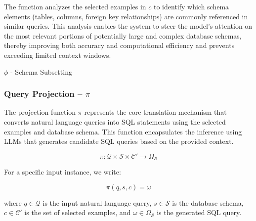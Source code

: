 The function analyzes the selected examples in $c$ to identify which schema elements
(tables, columns, foreign key relationships) are commonly referenced in similar queries.
This analysis enables the system to steer the model's attention on the most relevant
portions of potentially large and complex database schemas, thereby improving both accuracy
and computational efficiency and prevents exceeding limited context windows.

\begin{algorithm}
\caption{$\phi$ - Schema Subsetting}\label{algorithms:phi}
\begin{algorithmic}[1]
\end{algorithmic}
\end{algorithm}

\subsubsection{Query Projection – $\pi$}\label{design:projection-function}

The projection function $\pi$ represents the core translation mechanism that converts
natural language queries into SQL statements using the selected examples and database
schema. This function encapsulates the inference using LLMs that generates
candidate SQL queries based on the provided context.

$$
\pi: \mathcal{Q} \times \mathcal{S} \times \mathcal{C}' \rightarrow \Omega_{\mathcal{S}}
$$

\vspace{0.5em}

For a specific input instance, we write:

$$
\pi(q, s, c) = \omega
$$

\vspace{0.5em}

where $q \in \mathcal{Q}$ is the input natural language query, $s \in \mathcal{S}$ is
the database schema, $c \in \mathcal{C}'$ is the set of selected examples,
and $\omega \in \Omega_{\mathcal{S}}$ is the generated SQL query.

